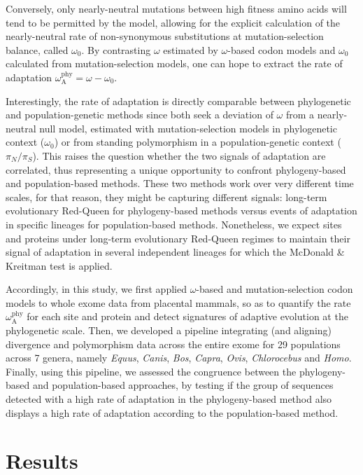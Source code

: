 \documentclass{article}
\newcommand{\rateApop}{\omega_{\mathrm{A}}}
\newcommand{\rateAphy}{\rateApop^{\mathrm{phy}}}
\newcommand{\pn}{\pi_N}
\newcommand{\ps}{\pi_S}
\newcommand{\pnps}{\pn / \ps}
\begin{document}
    Conversely, only nearly-neutral mutations between high fitness amino acids will tend to be permitted by the model, allowing for the explicit calculation of the nearly-neutral rate of non-synonymous substitutions at mutation-selection balance, called $\omega_{0}$\cite{spielman_relationship_2015, rodrigue_detecting_2017}.
    By contrasting $\omega$ estimated by $\omega$-based codon models and $\omega_{0}$ calculated from mutation-selection models, one can hope to extract the rate of adaptation $\rateAphy = \omega - \omega_{0}$.

    Interestingly, the rate of adaptation is directly comparable between phylogenetic and population-genetic methods since both seek a deviation of $\omega$  from a nearly-neutral null model, estimated with mutation-selection models in phylogenetic context ($\omega_{0}$) or from standing polymorphism in a population-genetic context ($\pnps$).
    This raises the question whether the two signals of adaptation are correlated, thus representing a unique opportunity to confront phylogeny-based and population-based methods.
    These two methods work over very different time scales, for that reason, they might be capturing different signals: long-term evolutionary Red-Queen for phylogeny-based methods versus events of adaptation in specific lineages for population-based methods.
    Nonetheless, we expect sites and proteins under long-term evolutionary Red-Queen regimes to maintain their signal of adaptation in several independent lineages for which the McDonald \& Kreitman test is applied.

    Accordingly, in this study, we first applied $\omega$-based and mutation-selection codon models to whole exome data from placental mammals, so as to quantify the rate $\rateAphy$ for each site and protein and detect signatures of adaptive evolution at the phylogenetic scale.
    Then, we developed a pipeline integrating (and aligning) divergence and polymorphism data across the entire exome for 29 populations across 7 genera, namely \textit{Equus}, \textit{Canis}, \textit{Bos}, \textit{Capra}, \textit{Ovis}, \textit{Chlorocebus} and \textit{Homo}.
    Finally, using this pipeline, we assessed the congruence between the phylogeny-based and population-based approaches, by testing if the group of sequences detected with a high rate of adaptation in the phylogeny-based method also displays a high rate of adaptation according to the population-based method.

    \section*{Results}\label{sec:results}
\end{document}

